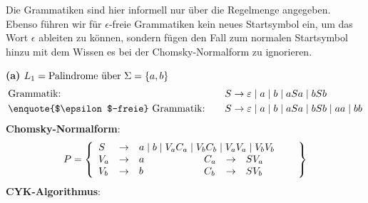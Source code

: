 \documentclass{beamer}
\begin{document}
	\begin{frame}
		\small
		\begin{center}
			\tiny Die Grammatiken sind hier informell nur über die Regelmenge angegeben. Ebenso führen wir für $\epsilon$-freie Grammatiken kein neues Startsymbol ein, um das Wort $\epsilon$ ableiten zu können, sondern fügen den Fall zum normalen Startsymbol hinzu mit dem Wissen es bei der Chomsky-Normalform zu ignorieren.
		\end{center}
	
		\textbf{(a)} $L_1 = \text{Palindrome über } \Sigma = \left\{ a,b \right\}$
		\begin{align*}
			&\text{Grammatik:} \quad && S \to \epsilon \mid a \mid b \mid aSa \mid bSb \\
			&\text{\enquote{$\epsilon$-freie} Grammatik:} \quad && S \to \epsilon \mid a \mid b \mid aSa  \mid bSb \mid aa \mid bb
		\end{align*}
		\textbf{Chomsky-Normalform}:
		\begin{equation*}
			P = \left\{
			\begin{array}{lcl c lcl}
				S &\to& \rlap{$a \mid b \mid V_a C_a \mid V_b C_b \mid V_a V_a \mid V_b V_b$} \\
				V_a &\to& a &\qquad\qquad& C_a &\to& S V_a \\
				V_b &\to& b &\qquad& C_b &\to& S V_b \\
			\end{array}
			\hspace{3em}\right\}
		\end{equation*}
		\textbf{CYK-Algorithmus}:
		\begin{center}
\end{center}
\end{frame}
\end{document}
